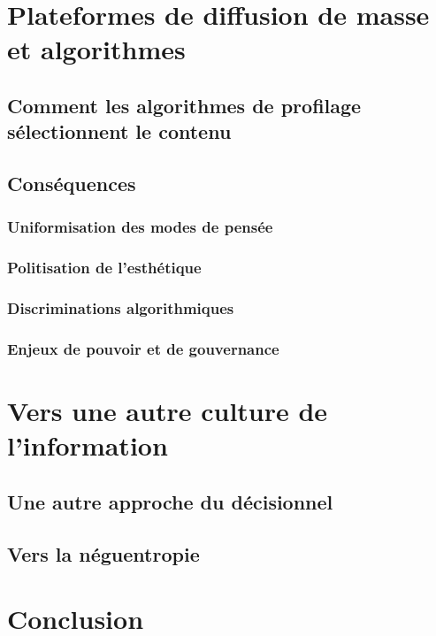 \documentclass[a4paper,12pt]{report}
\begin{document}
\chapter{Plateformes de diffusion de masse et algorithmes}

\section{Comment les algorithmes de profilage sélectionnent le contenu}

\section{Conséquences}

\subsection{Uniformisation des modes de pensée}

\subsection{Politisation de l'esthétique}

\subsection{Discriminations algorithmiques}

\subsection{Enjeux de pouvoir et de gouvernance}

\chapter{Vers une autre culture de l'information}

\section{Une autre approche du décisionnel}

\section{Vers la néguentropie}

\chapter*{Conclusion}




\newpage
\printglossary
\newpage
\printglossary[type=\acronymtype]
\end{document}
